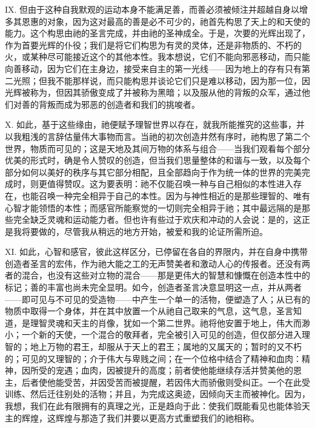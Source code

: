 IX. 但由于这种自我默观的运动本身不能满足善，而善必须被倾注并超越自身以增多其恩惠的对象，因为这对最高的善是必不可少的，祂首先构思了天上的和天使的能力。这个构思由祂的圣言完成，并由祂的圣神成全。于是，次要的光辉出现了，作为首要光辉的仆役；我们是将它们构思为有灵的灵体，还是非物质的、不朽的火，或某种尽可能接近这个的其他本性。我本想说，它们不能向邪恶移动，而只能向善移动，因为它们在主身边，接受来自主的第一光线——因为地上的存有只有第二光照；但我不能那样说，而只能构思并谈论它们只是难以移动，因为那一位，因光辉被称为，但因其骄傲变成了并被称为黑暗；以及服从他的背叛的众军，通过他们对善的背叛而成为邪恶的创造者和我们的挑唆者。\par

X. 如此，基于这些缘由，祂便赋予理智世界以存在，就我所能推究的这些事，并以我粗浅的言辞估量伟大事物而言。当祂的初次创造井然有序时，祂构思了第二个世界，物质而可见的；这是天地及其间万物的体系与组合——当我们观看每个部分优美的形式时，确是令人赞叹的创造，但当我们思量整体的和谐与一致，以及每个部分如何以美好的秩序与其它部分相配，且全部趋向于作为统一体的世界的完美完成时，则更值得赞叹。这为要表明：祂不仅能召唤一种与自己相似的本性进入存在，也能召唤一种完全相异于自己的本性。因为与神性相近的是那些理智的、唯有心智才能领悟的本性；而感官所能察觉的一切则完全相异于祂；其中最远隔的是那些完全缺乏灵魂和运动能力者。但也许有些过于欢庆和冲动的人会说：是的，这正是我将要做的，尽管我从稍远的地方开始，被爱和我的论证所需所迫。\par

XI. 如此，心智和感官，彼此这样区分，已停留在各自的界限内，并在自身中携带创造者圣言的宏伟，作为祂大能之工的无声赞美者和激动人心的传报者。还没有两者的混合，也没有这些对立物的混合——那是更伟大的智慧和慷慨在创造本性中的标记；善的丰富也尚未完全显明。如今，创造者圣言决意显明这一点，并从两者——即可见与不可见的受造物——中产生一个单一的活物，便塑造了人；从已有的物质中取得一个身体，并在其中放置一个从祂自己取来的气息，这气息，圣言知道，是理智灵魂和天主的肖像，犹如一个第二世界。祂将他安置于地上，伟大而渺小；一个新的天使，一个混合的敬拜者，完全被引入可见的创造，但仅部分进入理智的；地上万物的君王，却服从于天上的君王；属地的又属天的；暂时的又不朽的；可见的又理智的；介于伟大与卑贱之间；在一个位格中结合了精神和血肉：精神，因所受的宠遇；血肉，因被提升的高度；前者使他能继续存活并赞美他的恩主，后者使他能受苦，并因受苦而被提醒，若因伟大而骄傲则受纠正。一个在此受训练、然后迁往别处的活物；并且，为完成这奥迹，因倾向天主而被神化。因为，我想，我们在此有限拥有的真理之光，正是趋向于此：使我们既能看见也能体验天主的辉煌，这辉煌与那造了我们并要以更高方式重塑我们的祂相称。\par

